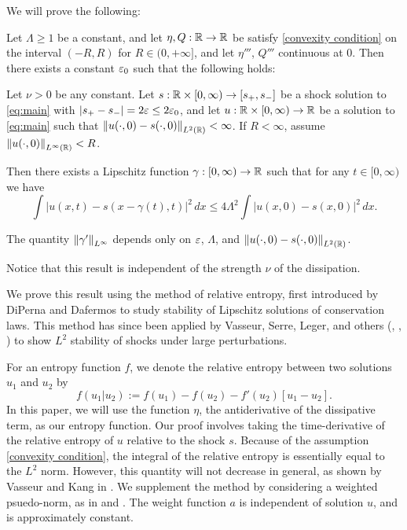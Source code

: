 We will prove the following:
\begin{theorem} \label{thm:main simple}
Let $\Lambda \geq 1$ be a constant, and let $\eta, Q: \mathbb{R} \to \mathbb{R}$ be satisfy \eqref{convexity condition} on the interval $(-R,R)$ for $R \in (0,+\infty]$, and let $\eta'''$, $Q'''$ continuous at 0.  Then there exists a constant $\varepsilon_0$ such that the following holds:

Let $\nu > 0$ be any constant.  Let $s: \mathbb{R} \times [0,\infty) \to [s_+,s_-]$ be a shock solution to \eqref{eq:main} with $|s_+ - s_-| = 2\varepsilon \leq 2\varepsilon_0$, and let $u:\mathbb{R}\times[0,\infty)\to\mathbb{R}$ be a solution to \eqref{eq:main} such that $\left\lVert u(\cdot,0) - s(\cdot,0)\right\rVert_{L^2(\mathbb{R})} < \infty$.  If $R < \infty$, assume $\left\lVert u(\cdot,0)\right\rVert_{L^\infty(\mathbb{R})} < R$.  

Then there exists a Lipschitz function $\gamma:[0,\infty) \to \mathbb{R}$ such that for any $t \in [0,\infty)$ we have
\[ \int |u(x,t) - s(x-\gamma(t),t)|^2 \,dx \leq 4\Lambda^2 \int |u(x,0) - s(x,0)|^2 \,dx. \]

The quantity $\left\lVert\gamma'\right\rVert_{L^\infty}$ depends only on $\varepsilon$, $\Lambda$, and $\left\lVert u(\cdot,0) - s(\cdot,0)\right\rVert_{L^2(\mathbb{R})}$.
\end{theorem}
Notice that this result is independent of the strength $\nu$ of the dissipation.  

We prove this result using the method of relative entropy, first introduced by DiPerna and Dafermos \cite{Da} to study stability of Lipschitz solutions of conservation laws.  This method has since been applied by Vasseur, Serre, Leger, and others (\cite{SeVa}, \cite{LeVa}, \cite{Le}) to show $L^2$ stability of shocks under large perturbations.  

For an entropy function $f$, we denote the relative entropy between two solutions $u_1$ and $u_2$ by
\[ f(u_1|u_2) := f(u_1) - f(u_2) - f'(u_2) [u_1-u_2]. \]
In this paper, we will use the function $\eta$, the antiderivative of the dissipative term, as our entropy function.  Our proof involves taking the time-derivative of the relative entropy of $u$ relative to the shock $s$.  Because of the assumption \eqref{convexity condition}, the integral of the relative entropy is essentially equal to the $L^2$ norm.  However, this quantity will not decrease in general, as shown by Vasseur and Kang in \cite{KaVa.burgers}.  We supplement the method by considering a weighted psuedo-norm, as in \cite{Va.entropy} and \cite{Va.recent}.  The weight function $a$ is independent of solution $u$, and is approximately constant.  

